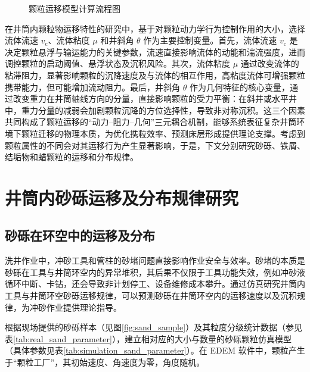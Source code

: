 \begin{figure}[htbp]
        \caption{颗粒运移模型计算流程图}
        \label{fig:flowchart}  
    \end{figure}


在井筒内颗粒物运移特性的研究中，基于对颗粒动力学行为控制作用的大小，选择流体流速 \(v_{\mathrm{c}}\)、流体粘度 \(\mu\) 和井斜角 \(\theta\) 作为主要控制变量。首先，流体流速 \(v_{\mathrm{c}}\) 是决定颗粒悬浮与输运能力的关键参数，流速直接影响流体的动能和湍流强度，进而调控颗粒的启动阈值、悬浮状态及沉积风险。其次，流体粘度 \(\mu\) 通过改变流体的粘滞阻力，显著影响颗粒的沉降速度及与流体的相互作用，高粘度流体可增强颗粒携带能力，但可能增加流动阻力。最后，井斜角 \(\theta\) 作为几何特征的核心变量，通过改变重力在井筒轴线方向的分量，直接影响颗粒的受力平衡：在斜井或水平井中，重力分量的减弱会加剧颗粒沉降的方位选择性，导致非对称沉积。这三个因素共同构成了颗粒运移的“动力--阻力--几何”三元耦合机制，能够系统表征复杂井筒环境下颗粒迁移的物理本质，为优化携粒效率、预测床层形成提供理论支撑。考虑到颗粒属性的不同会对其运移行为产生显著影响，于是，下文分别研究砂砾、铁屑、结垢物和蜡颗粒的运移和分布规律。

\section{井筒内砂砾运移及分布规律研究}

\subsection{砂砾在环空中的运移及分布}

洗井作业中，冲砂工具和管柱的砂堵问题直接影响作业安全与效率。砂堵的本质是砂砾在工具与井筒环空内的异常堆积，其后果不仅限于工具功能失效，例如冲砂液循环中断、卡钻，还会导致非计划停工、设备维修成本攀升。通过仿真研究井筒内工具与井筒环空砂砾运移规律，可以预测砂砾在井筒环空内的运移速度以及沉积规律，为冲砂作业提供理论指导。

根据现场提供的砂砾样本（见图\ref{fig:sand_sample}）及其粒度分级统计数据（参见表\ref{tab:real_sand_parameter}），建立相对应的大小与数量的砂砾颗粒仿真模型（具体参数见表\ref{tab:simulation_sand_parameter}）。在 EDEM 软件中，颗粒产生于“颗粒工厂”，其初始速度、角速度为零，角度随机。

